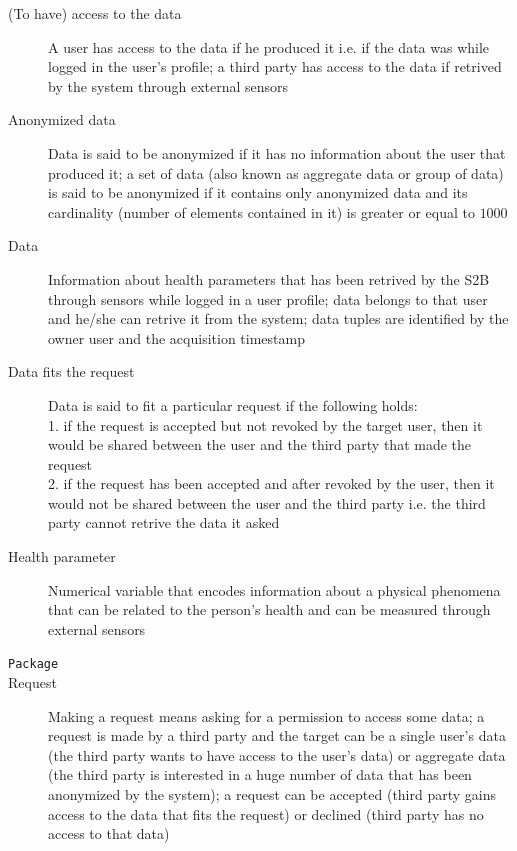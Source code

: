 \documentclass[12pt]{article}
\def \PACKAGE {\texttt{Package}}
\begin{document}
      \begin{description}
        \item[(To have) access to the data] A user has access to the data if he produced it i.e. if the data was
        while logged in the user's profile; a third party has access to the data if retrived by the system through external sensors
        \item[Anonymized data] Data is said to be anonymized if it has no information about the user that produced it; a set of data (also known as aggregate data or group of data) is said to be anonymized if it contains only anonymized data and its cardinality (number of elements contained in it) is greater or equal to $1000$
        \item[Data] Information about health parameters that has been retrived by the S2B through sensors while logged in a user profile; data belongs to that user and he/she can retrive it from the system; data tuples are identified by the owner user and the acquisition timestamp
        \item[Data fits the request] Data is said to fit a particular request if the following holds:\\
        1. if the request is accepted but not revoked by the target user, then it would be shared between the user and the third party that made the request \\
        2. if the request has been accepted and after revoked by the user, then it would not be shared between the user and the third party i.e. the third party cannot retrive the data it asked
        \item[Health parameter] Numerical variable that encodes information about a physical phenomena that can be related to the person's health and can be measured through external sensors
        \item[\PACKAGE] %
        \item[Request] Making a request means asking for a permission to access some data; a request is made by a third party and the target can be a single user's data (the third party wants to have access to the user's data) or aggregate data (the third party is interested in a huge number of data that has been anonymized by the system); a request can be accepted (third party gains access to the data that fits the request) or declined (third party has no access to that data)

\end{description}
\end{document}
